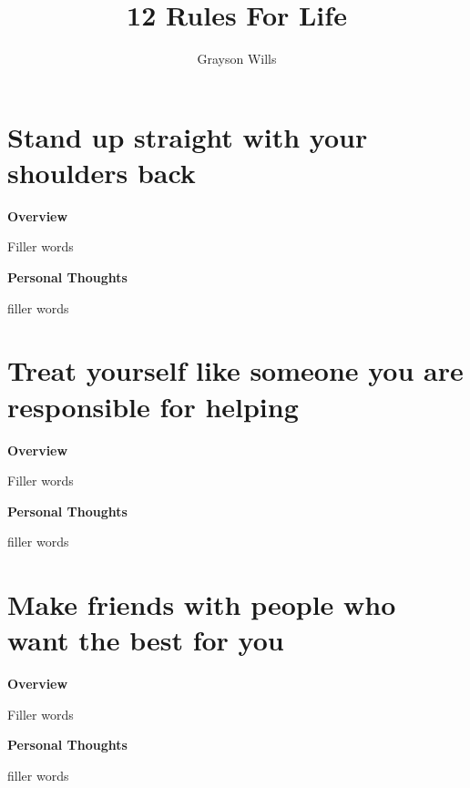 \documentclass{article}
\title{12 Rules For Life}
\author{Grayson Wills}
\begin{document}
\maketitle

\section{Stand up straight with your shoulders back}
    \begin{multicols}{2}
        \begin{center}
            \textbf{Overview}
        \end{center}
        
        Filler words 

        \begin{center}
            \textbf{Personal Thoughts}
        \end{center}
        
        filler words
        
    \end{multicols}
 
\section{Treat yourself like someone you are responsible for helping}
       \begin{multicols}{2}
        \begin{center}
            \textbf{Overview}
        \end{center}
        
        Filler words 

        \begin{center}
            \textbf{Personal Thoughts}
        \end{center}
        
        filler words
        
    \end{multicols}
    
\section{Make friends with people who want the best for you}
     \begin{multicols}{2}
        \begin{center}
            \textbf{Overview}
        \end{center}
        
        Filler words 

        \begin{center}
            \textbf{Personal Thoughts}
        \end{center}
        
        filler words
        
    \end{multicols}
\end{document}
